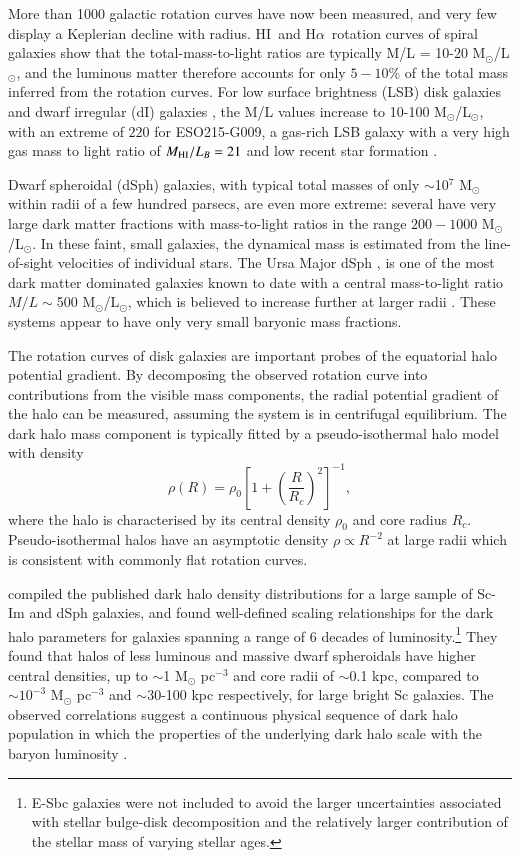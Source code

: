 \documentclass[traditabstract]{aa} %
\newcommand\HI{H{\small I}}
\newcommand\Ha{H$\alpha $}
\begin{document}
More than 1000 galactic rotation curves have now been measured, and
very few display a Keplerian decline with radius. \HI\ and \Ha\
rotation curves of spiral galaxies show that the total-mass-to-light
ratios are typically M/L = 10-20 M$_{\odot}$/L$_{\odot}$, and the
luminous matter therefore accounts for only $5-10\%$ of the total
mass inferred from the rotation curves.  For low surface brightness
(LSB) disk galaxies \citep{deblok1997} and dwarf irregular (dI)
galaxies \citep{swaters1999}, the M/L values increase to 10-100
M$_{\odot}$/L$_{\odot}$, with an extreme of $220$ for ESO215-G009,
a gas-rich LSB galaxy with a very high gas mass to light ratio of
$M_{\rm HI}/L_B = 21$ and low recent star formation \citep{wjk2004}.

Dwarf spheroidal (dSph) galaxies, with typical total masses of only
$\sim$10$^{7}$ M$_{\odot }$ within radii of a few hundred parsecs,
are even more extreme: several have very large dark matter fractions
with mass-to-light ratios in the range $200-1000$ M$_{\odot}$/L$_{\odot}$.
In these faint, small galaxies, the dynamical mass is estimated
from the line-of-sight velocities of individual stars.  The Ursa
Major dSph \citep{willmanetal2005}, is one of the most dark matter
dominated galaxies known to date with a central mass-to-light ratio
$M/L\sim$500 M$_{\odot}$/L$_{\odot}$, which is believed to increase
further at larger radii \citep{kweg2005}.  These systems appear to
have only very small baryonic mass fractions.

The rotation curves of disk galaxies are important probes
of the equatorial halo potential gradient. By decomposing the 
observed rotation curve into contributions from the visible mass 
components, the radial potential gradient of the
halo can be measured, assuming the system is in centrifugal 
equilibrium. The dark halo mass component is typically fitted
by a pseudo-isothermal halo model with density 
\begin{equation}
\label{eq:pISO} 
\rho(R) = \rho_0 \left[ 1 + \left(\frac{R}{R_c}\right)^2 \right]^{-1},
\end{equation}  
where the halo is characterised by its
central density $\rho_0$ and core radius $R_c$. Pseudo-isothermal halos have
an asymptotic density $\rho \propto R^{-2}$ at large radii 
which is consistent with commonly flat rotation curves.

\citet{kf2004} compiled the published dark halo density distributions
for a large sample of Sc-Im and dSph galaxies, and found well-defined
scaling relationships for the dark halo parameters for galaxies
spanning a range of 6 decades of luminosity.\footnote{E-Sbc galaxies
were not included to avoid the larger uncertainties associated with
stellar bulge-disk decomposition and the relatively larger contribution
of the stellar mass of varying stellar ages.}  They found that halos
of less luminous and massive dwarf spheroidals have higher central densities,
up to $\sim$1 M$_{\odot}$ pc$^{-3}$  and
core radii of $\sim$0.1 kpc, compared to $\sim10^{-3}$ M$_{\odot}$
pc$^{-3}$ and $\sim$30-100 kpc respectively, for large bright Sc
galaxies. The observed correlations suggest a continuous physical
sequence of dark halo population in which the properties of the
underlying dark halo scale with the baryon luminosity \citep{kf2004}.
\end{document}

